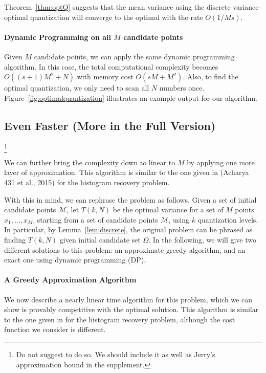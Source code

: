 Theorem~\ref{thm:optQ} suggests that the mean variance using the discrete variance-optimal quantization will converge to the optimal with the rate $O(1/Ms)$.

\vspace{-0.5em}
\paragraph*{Dynamic Programming on all $M$ candidate points}
Given $M$ candidate points, we can apply the same dynamic
programming algorithm. 
In this case, the total computational complexity 
becomes $O((s+1)M^2 + N)$ with memory cost 
$O(sM + M^2)$. Also, to find the optimal quantization, 
we only need to scan all $N$ numbers once.
Figure~\ref{fig:optimalquantization} illustrates
an example output for our algorithm.

\vspace{-0.5em}
\subsection{Even Faster (More in the Full Version)} \footnote{Do not suggest to do so. We should include it as well as Jerry's approximation bound in the supplement.}
\vspace{-0.5em}

We can further bring the complexity 
down to linear to $M$ by applying
one more layer of approximation. This algorithm is similar 
to the one given in (Acharya 431 et al., 2015) for the histogram recovery problem.



\iffalse
With this in mind, we can rephrase the problem as follows. 
Given a set of initial candidate points $\mathcal{M}$, 
let $T(k, N)$ be the optimal variance for a set of $M$ points $x_1, \ldots, x_M$, 
starting from a set of candidate points $\mathcal{M}$, using $k$ quantization levels. 
In particular, by Lemma~\ref{lem:discrete}, the original problem can be phrased as finding $T(k, N)$ given initial candidate set $\Omega$. 
In the following, we will give two different solutions to this problem: an approximate greedy algorithm, and an exact one using dynamic programming (DP). 

 \paragraph*{A Greedy Approximation Algorithm}
We now describe a nearly linear time algorithm for this problem, which we can show is provably competitive with the optimal solution.
This algorithm is similar to the one given in \cite{ADHLS15} for the histogram recovery problem, although the cost function we consider is different. 

